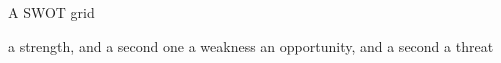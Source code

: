 \documentclass[xcolor=dvipsnames, aspectratio=1610]{beamer}
\begin{document}
\begin{frame}{A SWOT grid}

  \swot
    {\scriptsize a strength, and a second one}
    {\scriptsize a weakness}
    {\scriptsize an opportunity, and a second}
    {\scriptsize a threat}

\end{frame}
\end{document}
